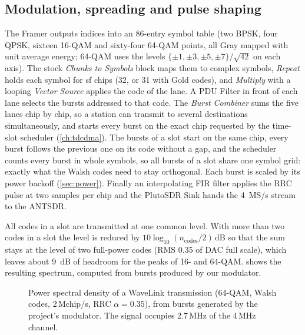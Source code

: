 \documentclass[11pt,a4paper,oneside]{report}
\begin{document}
\subsection{Modulation, spreading and pulse shaping}\label{sec:modspread}
The Framer outputs indices into an 86-entry symbol table (two BPSK, four QPSK, sixteen 16-QAM and
sixty-four 64-QAM points, all Gray mapped with unit average energy; 64-QAM uses the levels
$\{\pm1,\pm3,\pm5,\pm7\}/\sqrt{42}$ on each axis). The stock \emph{Chunks to Symbols} block maps
them to complex symbols, \emph{Repeat} holds each symbol for sf chips (32, or 31 with Gold codes), and
\emph{Multiply} with a looping \emph{Vector Source} applies the code of the lane. A PDU Filter in front
of each lane selects the bursts addressed to that code. The \emph{Burst Combiner} sums the five lanes
chip by chip, so a station can transmit to several destinations simultaneously, and starts every burst
on the exact chip requested by the time-slot scheduler (\cref{ch:tdcdma}). The bursts of a slot start
on the same chip, every burst follows the previous one on its code without a gap, and the scheduler
counts every burst in whole symbols, so all bursts of a slot share one symbol grid: exactly what the
Walsh codes need to stay orthogonal. Each burst is scaled by its power backoff (\cref{sec:power}).
Finally an interpolating FIR filter applies the RRC pulse at two samples per chip and the PlutoSDR
Sink hands the \SI{4}{MS/s} stream to the ANTSDR.

All codes in a slot are transmitted at one common level. With more than two codes in a slot the level
is reduced by $10\log_{10}(n_\text{codes}/2)$\,dB so that the sum stays at the level of two full-power
codes (RMS 0.35 of DAC full scale), which leaves about \SI{9}{dB} of headroom for the peaks of 16- and
64-QAM.
 shows the resulting spectrum, computed from bursts produced by our modulator.

\begin{figure}[htbp]
\centering
{}
\caption{Power spectral density of a WaveLink transmission (64-QAM, Walsh codes, 2\,Mchip/s, RRC
$\alpha=0.35$), from bursts generated by the project's modulator. The signal occupies 2.7\,MHz of the
4\,MHz channel.}
\label{fig:psd}
\end{figure}
\end{document}
